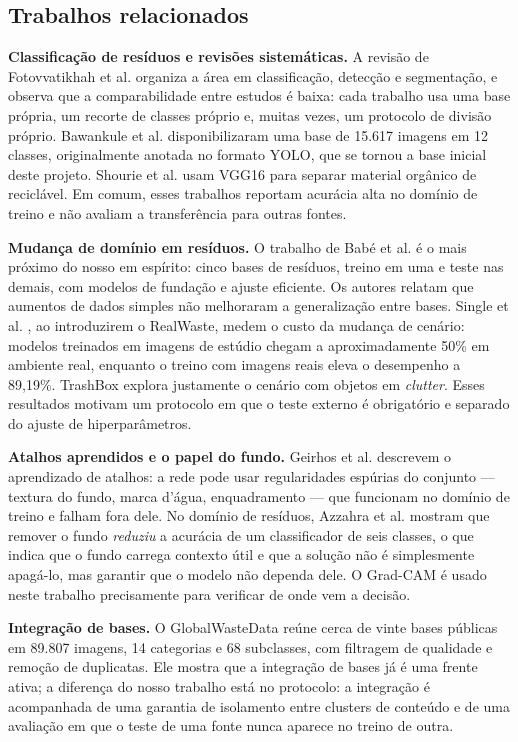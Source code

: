 \documentclass[11pt,a4paper]{article}
\begin{document}
	\subsection{Trabalhos relacionados}
	
	\textbf{Classificação de resíduos e revisões sistemáticas.} A revisão de Fotovvatikhah et al. \cite{fotovvatikhah2025} organiza a área em classificação, detecção e segmentação, e observa que a comparabilidade entre estudos é baixa: cada trabalho usa uma base própria, um recorte de classes próprio e, muitas vezes, um protocolo de divisão próprio. Bawankule et al. \cite{bawankule2023} disponibilizaram uma base de 15.617 imagens em 12 classes, originalmente anotada no formato YOLO, que se tornou a base inicial deste projeto. Shourie et al. \cite{shourie2024} usam VGG16 para separar material orgânico de reciclável. Em comum, esses trabalhos reportam acurácia alta no domínio de treino e não avaliam a transferência para outras fontes.
	
	\textbf{Mudança de domínio em resíduos.} O trabalho de Babé et al. \cite{babe2025} é o mais próximo do nosso em espírito: cinco bases de resíduos, treino em uma e teste nas demais, com modelos de fundação e ajuste eficiente. Os autores relatam que aumentos de dados simples não melhoraram a generalização entre bases. Single et al. \cite{single2023}, ao introduzirem o RealWaste, medem o custo da mudança de cenário: modelos treinados em imagens de estúdio chegam a aproximadamente 50\% em ambiente real, enquanto o treino com imagens reais eleva o desempenho a 89,19\%. TrashBox \cite{kumsetty2022} explora justamente o cenário com objetos em \textit{clutter}. Esses resultados motivam um protocolo em que o teste externo é obrigatório e separado do ajuste de hiperparâmetros.
	
	\textbf{Atalhos aprendidos e o papel do fundo.} Geirhos et al. \cite{geirhos2020} descrevem o aprendizado de atalhos: a rede pode usar regularidades espúrias do conjunto --- textura do fundo, marca d'água, enquadramento --- que funcionam no domínio de treino e falham fora dele. No domínio de resíduos, Azzahra et al. \cite{azzahra2026} mostram que remover o fundo \emph{reduziu} a acurácia de um classificador de seis classes, o que indica que o fundo carrega contexto útil e que a solução não é simplesmente apagá-lo, mas garantir que o modelo não dependa dele. O Grad-CAM é usado neste trabalho precisamente para verificar de onde vem a decisão.
	
	\textbf{Integração de bases.} O GlobalWasteData \cite{ijaz2026} reúne cerca de vinte bases públicas em 89.807 imagens, 14 categorias e 68 subclasses, com filtragem de qualidade e remoção de duplicatas. Ele mostra que a integração de bases já é uma frente ativa; a diferença do nosso trabalho está no protocolo: a integração é acompanhada de uma garantia de isolamento entre clusters de conteúdo e de uma avaliação em que o teste de uma fonte nunca aparece no treino de outra.
	
\end{document}
